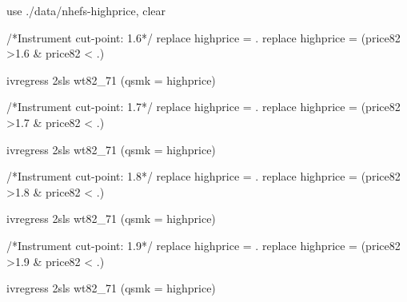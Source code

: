 \documentclass[
  10pt,
  a4paper,
]{book}
\newenvironment{Shaded}{\begin{snugshade}}{\end{snugshade}}
\newcommand{\CommentTok}[1]{\textcolor[rgb]{0.37,0.37,0.37}{#1}}
\newcommand{\KeywordTok}[1]{\textcolor[rgb]{0.00,0.46,0.62}{#1}}
\newcommand{\NormalTok}[1]{\textcolor[rgb]{0.00,0.46,0.62}{#1}}
\begin{document}
\begin{Shaded}
\begin{Highlighting}[]
\KeywordTok{use}\NormalTok{ ./}\KeywordTok{data}\NormalTok{/nhefs{-}highprice, }\KeywordTok{clear}

\CommentTok{/*Instrument cut{-}point: 1.6*/}
\KeywordTok{replace}\NormalTok{ highprice = .}
\KeywordTok{replace}\NormalTok{ highprice = (price82 \textgreater{}1.6 \& price82 \textless{} .)}

\NormalTok{ivregress 2sls wt82\_71 (qsmk = highprice)}

\CommentTok{/*Instrument cut{-}point: 1.7*/}
\KeywordTok{replace}\NormalTok{ highprice = .}
\KeywordTok{replace}\NormalTok{ highprice = (price82 \textgreater{}1.7 \& price82 \textless{} .)}

\NormalTok{ivregress 2sls wt82\_71 (qsmk = highprice)}

\CommentTok{/*Instrument cut{-}point: 1.8*/}
\KeywordTok{replace}\NormalTok{ highprice = .}
\KeywordTok{replace}\NormalTok{ highprice = (price82 \textgreater{}1.8 \& price82 \textless{} .)}

\NormalTok{ivregress 2sls wt82\_71 (qsmk = highprice)}

\CommentTok{/*Instrument cut{-}point: 1.9*/}
\KeywordTok{replace}\NormalTok{ highprice = .}
\KeywordTok{replace}\NormalTok{ highprice = (price82 \textgreater{}1.9 \& price82 \textless{} .)}

\NormalTok{ivregress 2sls wt82\_71 (qsmk = highprice)}
\end{Highlighting}
\end{Shaded}
\end{document}
